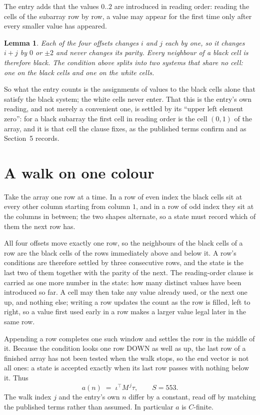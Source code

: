 \documentclass[11pt,a4paper]{article}
\theoremstyle{plain}
\newtheorem{lemma}[theorem]{Lemma}
\theoremstyle{definition}
\begin{document}
The entry adds that the values $0..2$ are introduced in reading order: reading the cells of the subarray row by row, a value may appear for the first time only after every smaller value has appeared.

\begin{lemma}\label{lem:split}
Each of the four offsets changes $i$ and $j$ each by one, so it changes $i+j$ by $0$ or $\pm2$
and never changes its parity. Every neighbour of a black cell is therefore black. The condition
above splits into two systems that share no cell: one on the black cells and one on the white
cells.
\end{lemma}

So what the entry counts is the assignments of values to the black cells alone that satisfy the
black system; the white cells never enter. That this is the entry's own reading, and not
merely a convenient one, is settled by its ``upper left element zero'': for a black subarray the
first cell in reading order is the cell $(0,1)$ of the array, and it is that cell the
clause fixes, as the published terms confirm and as Section~5 records.

\section{A walk on one colour}

Take the array one row at a time. In a row of even index the black cells sit at every other
column starting from column $1$, and in a row of odd index they sit at the columns in
between; the two shapes alternate, so a state must record which of them the next row has.

All four offsets move exactly one row, so the neighbours of the black cells of a row are the
black cells of the rows immediately above and below it. A row's conditions are therefore settled
by three consecutive rows, and the state is the last two of them together with the parity of the
next.
The reading-order clause is carried as one more number in the state: how many distinct values
have been introduced so far. A cell may then take any value already used, or the next one up,
and nothing else; writing a row updates the count as the row is filled, left to right, so a
value first used early in a row makes a larger value legal later in the same row.


Appending a row completes one such window and settles the row in the middle of it. Because the
condition looks one row DOWN as well as up, the last row of a finished array has not been tested
when the walk stops, so the end vector is not all ones: a state is accepted exactly when its
last row passes with nothing below it. Thus
\[
a(n)\;=\;\iota^{\!\top}M^{\,j}\tau ,\qquad S=553.
\]
The walk index $j$ and the entry's own $n$ differ by a constant, read off by matching the
published terms rather than assumed. In particular $a$ is $C$-finite.
\end{document}
